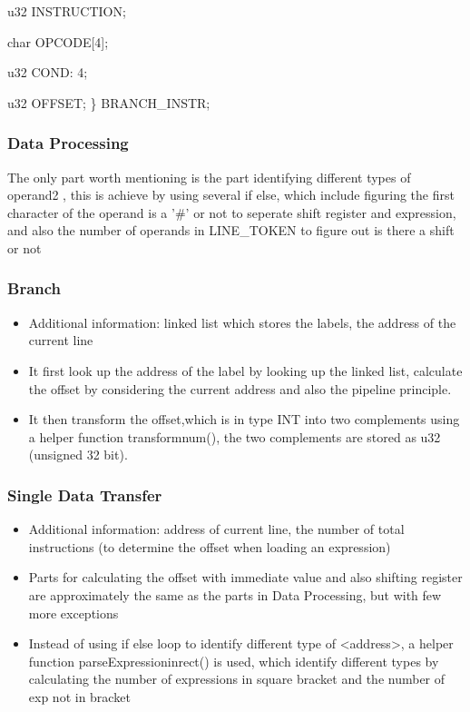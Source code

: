 \documentclass[11pt]{article}
\begin{document}
   u32 INSTRUCTION;

   char OPCODE[4];

   u32 COND: 4;

   u32 OFFSET;\newline
\} BRANCH{\_}INSTR;



\subsubsection{Data Processing}
The only part worth mentioning is the part identifying different types of operand2 , this is achieve by using several if else, which include figuring the first character of the operand is a '\#' or not to seperate shift register and expression, and also the number of operands in LINE{\_}TOKEN to figure out is there a shift or not

\subsubsection{Branch}
\begin{itemize}  
\item Additional information: linked list which stores the labels, the address of the current line

\item It first look up the address of the label by looking up the linked list, calculate the offset by considering the current address and also the pipeline principle.

\item It then transform the offset,which is in type INT into two complements using a helper function transformnum(), the two complements are stored as u32 (unsigned 32 bit).
\end{itemize}




\subsubsection{Single Data Transfer}
\begin{itemize}  
\item Additional information: address of current line, the number of total instructions (to determine the offset when loading an expression)

\item Parts for calculating the offset with immediate value and also shifting register are approximately the same as the parts in Data Processing, but with few more exceptions

\item Instead of using if else loop to identify different type of <address>, a helper function parseExpressioninrect() is used, which identify different types by calculating the number of expressions in square bracket and the number of exp not in bracket
\end{itemize}
\end{document}
